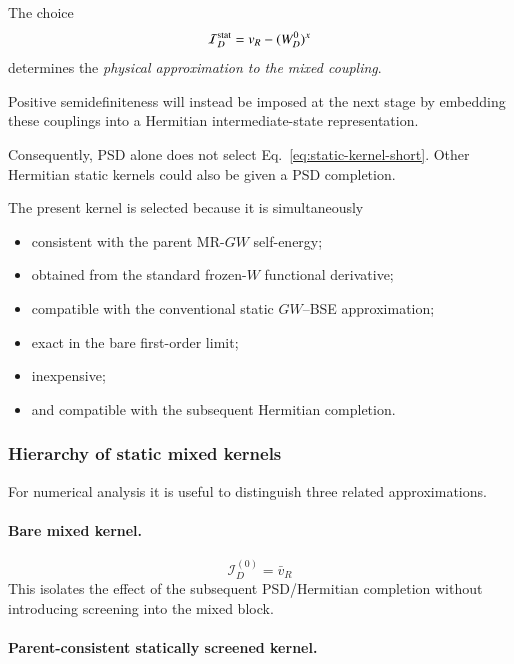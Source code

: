 \documentclass[aip,jcp,reprint,noshowkeys,superscriptaddress]{revtex4-1}
\begin{document}
The choice
\begin{equation}
  \mathcal I_D^{\rm stat}
  =
  v_R-(W_D^0)^x
\end{equation}
determines the \emph{physical approximation to the mixed coupling}.

Positive semidefiniteness will instead be imposed at the next stage by
embedding these couplings into a Hermitian intermediate-state
representation.

Consequently, PSD alone does not select
Eq.~\eqref{eq:static-kernel-short}.  Other Hermitian static kernels
could also be given a PSD completion.

The present kernel is selected because it is simultaneously

\begin{itemize}
  \item consistent with the parent MR-$GW$ self-energy;
  \item obtained from the standard frozen-$W$ functional derivative;
  \item compatible with the conventional static $GW$--BSE
        approximation;
  \item exact in the bare first-order limit;
  \item inexpensive;
  \item and compatible with the subsequent Hermitian completion.
\end{itemize}


\subsubsection{Hierarchy of static mixed kernels}

For numerical analysis it is useful to distinguish three related
approximations.

\paragraph{Bare mixed kernel.}

\begin{equation}
  \mathcal I_D^{(0)}
  =
  \bar v_R
\end{equation}
This isolates the effect of the subsequent PSD/Hermitian completion
without introducing screening into the mixed block.

\paragraph{Parent-consistent statically screened kernel.}
\end{document}
